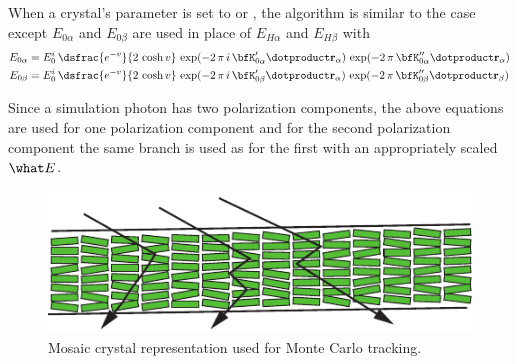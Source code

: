 When a crystal's  parameter is set to  or
, the algorithm is similar to the  case except $E_{0\alpha}$
and $E_{0\beta}$ are used in place of $E_{H\alpha}$ and $E_{H\beta}$ with
\begin{align}
  E_{0\alpha} &= E_0^i \, \dsfrac{e^{-v}}{2 \, \cosh v} \, 
    \exp({-2 \, \pi \, i \, \bfK'_{0\alpha} \dotproduct \bfr_\alpha}) \,
    \exp({-2 \, \pi \, \bfK''_{0\alpha} \dotproduct \bfr_\alpha}) \CRNO
  E_{0\beta} &= E_0^i \, \dsfrac{e^{-v}}{2 \, \cosh v} \, 
    \exp({-2 \, \pi \, i \, \bfK'_{0\beta} \dotproduct \bfr_\alpha}) \,
    \exp({-2 \, \pi \, \bfK''_{0\beta} \dotproduct \bfr_\beta})
\end{align}

Since a simulation photon has two polarization components, the above equations are used for one
polarization component and for the second polarization component the same branch is used as for the
first with an appropriately scaled $\what E$.

%
%


\begin{figure}[tb]
  \centering
  \includegraphics[width=5in]{mosaic-crystal.pdf}
  \caption[Mosaic crystal Monte Carlo tracking.]{Mosaic crystal representation used for Monte Carlo tracking.}
  \label{f:mosaic.crystal}
\end{figure}

